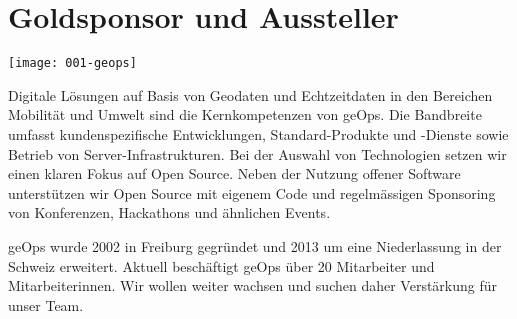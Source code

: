 \section*{Goldsponsor und Aussteller}
\begin{center}
	\texttt{[image: 001-geops]}
\end{center}
Digitale Lösungen auf Basis von Geodaten und Echtzeitdaten in den
Bereichen Mobilität und Umwelt sind die Kernkompetenzen von geOps. Die
Bandbreite umfasst kundenspezifische Entwicklungen, Standard-Produkte und
-Dienste sowie Betrieb von Server-Infrastrukturen. Bei der Auswahl von
Technologien setzen wir einen klaren Fokus auf Open Source. Neben der
Nutzung offener Software unterstützen wir Open Source mit eigenem Code
und regelmässigen Sponsoring von Konferenzen, Hackathons und ähnlichen
Events.

geOps wurde 2002 in Freiburg gegründet und 2013 um eine
Niederlassung in der Schweiz erweitert. Aktuell beschäftigt geOps über 20
Mitarbeiter und Mitarbeiterinnen.  Wir wollen weiter wachsen und suchen
daher Verstärkung für unser Team.
